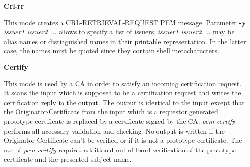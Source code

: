 {\large\bf Crl-rr}

This mode creates a CRL-RETRIEVAL-REQUEST PEM message. Parameter {\bf -y} {\em issuer1 issuer2 
...}
allows to specify a list of issuers. {\em issuer1 issuer2 ...} may be alias names or distinguished
names in their printable representation. In the latter case, the names must be quoted since they
contain shell metacharacters.

{\large\bf Certify}

This mode is used by a CA in order to satisfy an incoming certification request. It scans the input
which is supposed to be a certification request and writes the certification reply to the output.
The output is identical to the input except that the Originator-Certificate from the input which
is a requestor generated prototype certificate is replaced by a certificate signed by the CA.
{\em pem certify} performs all necessary validation and checking. No output is written if the
Originator-Certificate can't be verified or if it is not a prototype certificate. The use
of {\em pem certify} requires additional out-of-band verification of the prototype certificate
and the presented subject name.

